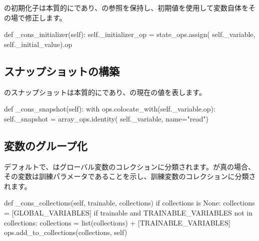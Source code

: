 \begin{content}
の初期化子は本質的にであり、の参照を保持し、初期値を使用して変数自体をその場で修正します。

\begin{leftbar}
\begin{python}
  def _cons_initializer(self):
    self._initializer_op = state_ops.assign(
      self._variable,
      self._initial_value).op
\end{python}
\end{leftbar}

\subsection{スナップショットの構築}

のスナップショットは本質的にであり、の現在の値を表します。

\begin{leftbar}
\begin{python}
  def _cons_snapshot(self):
    with ops.colocate_with(self._variable.op):
      self._snapshot = array_ops.identity(
        self._variable, name="read")
\end{python}
\end{leftbar}

\subsection{変数のグループ化}

デフォルトで、はグローバル変数のコレクションに分類されます。が真の場合、その変数は訓練パラメータであることを示し、訓練変数のコレクションに分類されます。

\begin{leftbar}
\begin{python}
  def _cons_collections(self, trainable, collections)
    if collections is None:
      collections = [GLOBAL_VARIABLES]
    if trainable and TRAINABLE_VARIABLES not in collections:
      collections = list(collections) + [TRAINABLE_VARIABLES]
    ops.add_to_collections(collections, self)
\end{python}
\end{leftbar}

\end{content}
